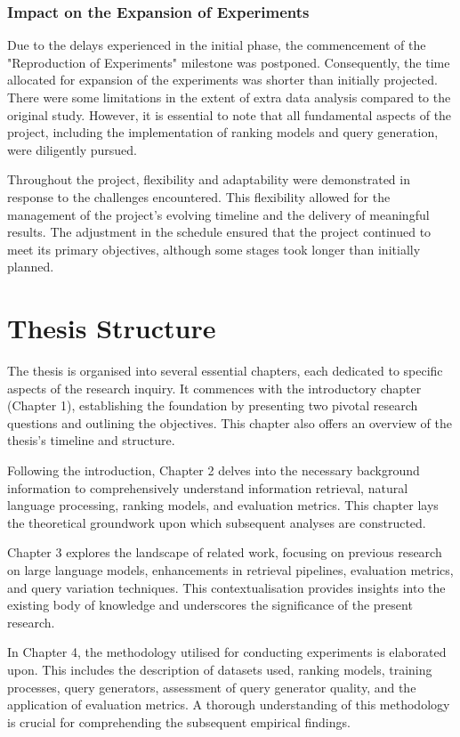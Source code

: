 \subsubsection{Impact on the Expansion of Experiments}
Due to the delays experienced in the initial phase, the commencement of the "Reproduction of Experiments" milestone was postponed. Consequently, the time allocated for expansion of the experiments was shorter than initially projected. There were some limitations in the extent of extra data analysis compared to the original study. However, it is essential to note that all fundamental aspects of the project, including the implementation of ranking models and query generation, were diligently pursued.

Throughout the project, flexibility and adaptability were demonstrated in response to the challenges encountered. This flexibility allowed for the management of the project's evolving timeline and the delivery of meaningful results. The adjustment in the schedule ensured that the project continued to meet its primary objectives, although some stages took longer than initially planned.

\section{Thesis Structure}
The thesis is organised into several essential chapters, each dedicated to specific aspects of the research inquiry. It commences with the introductory chapter (Chapter 1), establishing the foundation by presenting two pivotal research questions and outlining the objectives. This chapter also offers an overview of the thesis's timeline and structure.

Following the introduction, Chapter 2 delves into the necessary background information to comprehensively understand information retrieval, natural language processing, ranking models, and evaluation metrics. This chapter lays the theoretical groundwork upon which subsequent analyses are constructed.

Chapter 3 explores the landscape of related work, focusing on previous research on large language models, enhancements in retrieval pipelines, evaluation metrics, and query variation techniques. This contextualisation provides insights into the existing body of knowledge and underscores the significance of the present research.

In Chapter 4, the methodology utilised for conducting experiments is elaborated upon. This includes the description of datasets used, ranking models, training processes, query generators, assessment of query generator quality, and the application of evaluation metrics. A thorough understanding of this methodology is crucial for comprehending the subsequent empirical findings.

